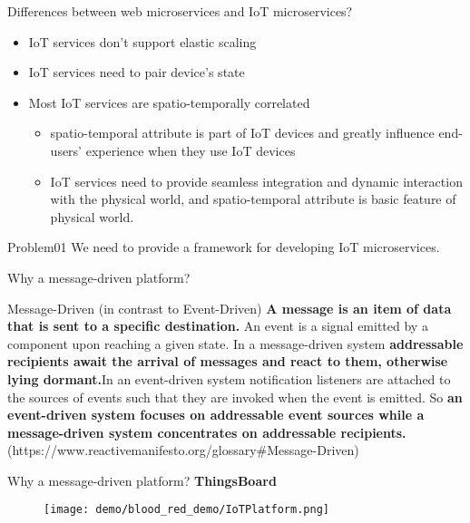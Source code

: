 \documentclass[notheorems, aspectratio=54]{beamer}
\begin{document}
\begin{frame}{Differences between web microservices and IoT microservices?}
    \begin{itemize}
        \item IoT services don't support elastic scaling 
        \item IoT services need to pair device's state  
        \item Most IoT services are spatio-temporally correlated
        \begin{itemize}
            \item spatio-temporal attribute is part of IoT devices and greatly influence end-users' experience when they use IoT devices
            \item IoT services need to provide seamless integration and dynamic interaction with the physical world, and  spatio-temporal attribute is basic feature of physical world.
        \end{itemize}
    \end{itemize}
    \begin{block}{Problem01}
    We need to provide a framework for developing IoT microservices.
    \end{block}
\end{frame}

\begin{frame}{Why a message-driven platform?}
    \begin{block}{Message-Driven (in contrast to Event-Driven)}
    \textbf{\alert{A message is an item of data that is sent to a specific destination.}} An event is a signal emitted by a component upon reaching a given state. In a message-driven system \textbf{\alert{addressable recipients await the arrival of messages and react to them, otherwise lying dormant.}}In an event-driven system notification listeners are attached to the sources of events such that they are invoked when the event is emitted. So \textbf{\alert{an event-driven system focuses on addressable event sources while a message-driven system concentrates on addressable recipients.}} (https://www.reactivemanifesto.org/glossary#Message-Driven)
    \end{block}
\end{frame}

\begin{frame}{Why a message-driven platform?}
    \textbf{ThingsBoard}
    \begin{figure}[t]                               
    \texttt{[image: demo/blood\_red\_demo/IoTPlatform.png]}
    \centering
    \end{figure}
\end{frame}
\end{document}
